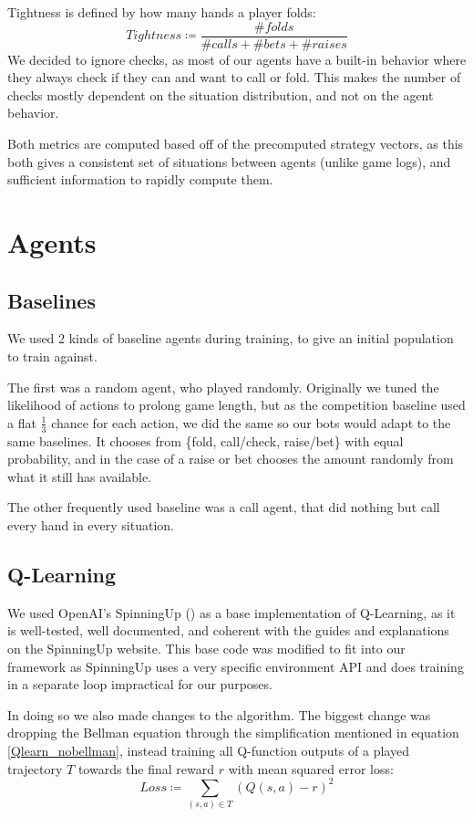 Tightness is defined by how many hands a player folds:
\begin{equation}
    Tightness \coloneqq \frac{\# folds}{\# calls + \# bets + \# raises}
\end{equation}
We decided to ignore checks, as most of our agents have a built-in behavior where they always check if they can and want to call or fold. This makes the number of checks mostly dependent on the situation distribution, and not on the agent behavior.

Both metrics are computed based off of the precomputed strategy vectors, as this both gives a consistent set of situations between agents (unlike game logs), and sufficient information to rapidly compute them.
\section{Agents}

\subsection{Baselines}
We used 2 kinds of baseline agents during training, to give an initial population to train against.

The first was a random agent, who played randomly. Originally we tuned the likelihood of actions to prolong game length, but as the competition baseline used a flat $\frac{1}{3}$ chance for each action, we did the same so our bots would adapt to the same baselines. It chooses from \{fold, call/check, raise/bet\} with equal probability, and in the case of a raise or bet chooses the amount randomly from what it still has available.

The other frequently used baseline was a call agent, that did nothing but call every hand in every situation.

\subsection{Q-Learning}
We used OpenAI's SpinningUp (\cite{SpinningUp2018}) as a base implementation of Q-Learning, as it is well-tested, well documented, and coherent with the guides and explanations on the SpinningUp website. This base code was modified to fit into our framework as SpinningUp uses a very specific environment API and does training in a separate loop impractical for our purposes.

In doing so we also made changes to the algorithm. The biggest change was dropping the Bellman equation through the simplification mentioned in equation \ref{Qlearn_nobellman}, instead training all Q-function outputs of a played trajectory $T$ towards the final reward $r$ with mean squared error loss:
\begin{equation}
    Loss \coloneqq \sum_{(s, a) \in T} (Q(s, a) - r)^2
\end{equation}

